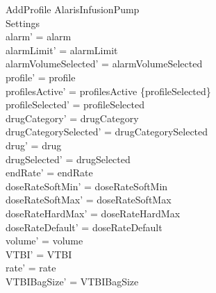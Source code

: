 \begin{schema}{AddProfile}
	\Delta AlarisInfusionPump\\
	 Settings\\
	\where
	alarm' = alarm\\
	\pagebreak
	alarmLimit' = alarmLimit\\
	alarmVolumeSelected' = alarmVolumeSelected\\
	profile' = profile\\
	profilesActive' = profilesActive \cup \{profileSelected\}\\
	profileSelected' = profileSelected\\
	drugCategory' = drugCategory\\ 
	drugCategorySelected' = drugCategorySelected\\
	drug' = drug\\ 
	drugSelected' = drugSelected\\
	endRate' = endRate\\
	doseRateSoftMin' = doseRateSoftMin\\
	doseRateSoftMax' = doseRateSoftMax\\
	doseRateHardMax' = doseRateHardMax\\
	doseRateDefault' = doseRateDefault\\
	volume' = volume\\
	VTBI' = VTBI\\
	rate' = rate\\
	VTBIBagSize' = VTBIBagSize\\ 

\end{schema}

